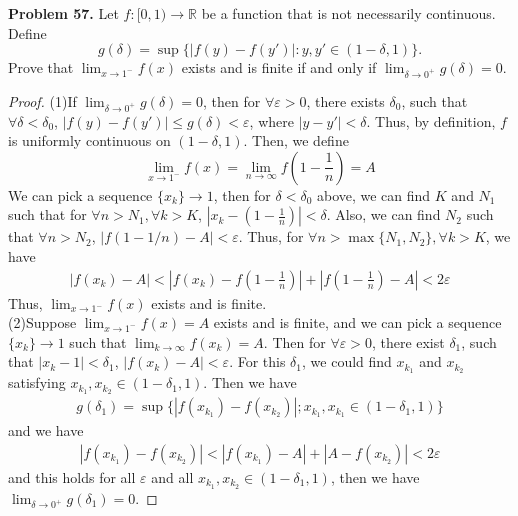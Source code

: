\documentclass[12pt,leqno]{amsart}
\begin{document}
\noindent
{\bf Problem 57.}
Let $f:[0,1)\to\mathbb{R}$ be a function that is not necessarily continuous. Define
$$
g(\delta)=\sup\{|f(y)-f(y')|:y,y'\in (1-\delta,1)\}.
$$
Prove that $\displaystyle\lim_{x\to 1^-} f(x)$ exists and is finite if and only if $\displaystyle\lim_{\delta\to 0^+}g(\delta)=0$.
\begin{proof}
(1)If $\lim_{\delta\to 0^+}g(\delta)=0$, then for $\forall \varepsilon>0$, there exists $\delta_0$, such that $\forall \delta<\delta_0$, $|f(y)-f(y')|\leq g(\delta)<\varepsilon$, where $|y-y'|<\delta$. Thus, by definition, $f$ is uniformly continuous on $(1-\delta,1)$. Then, we define $$\lim_{x\to 1^-}f(x)=\lim_{n\to\infty}f\left(1-\frac{1}{n}\right)=A$$
We can pick a sequence $\{x_k\}\rightarrow 1$, then for $\delta<\delta_0$ above, we can find $K$ and $N_1$ such that for $\forall n>N_1, \forall k > K$, $|x_k-(1-\frac{1}{n})|<\delta$. Also, we can find $N_2$ such that $\forall n>N_2$, $|f(1-1/n)-A|<\varepsilon$. Thus, for $\forall n>\max\{N_1,N_2\}, \forall k > K$, we have
\begin{align*}
    |f(x_k)-A|<\left|f(x_k)-f\left(1-\frac{1}{n}\right)\right|+\left|f\left(1-\frac{1}{n}\right)-A\right|<2\varepsilon
\end{align*}
Thus, $\lim_{x\to 1^-}f(x)$ exists and is finite. \\
\hspace*{3em}(2)Suppose $\lim_{x\to 1^-}f(x)=A$ exists and is finite, and we can pick a sequence $\{x_k\}\rightarrow 1$ such that $\lim_{k\to\infty}f(x_k)=A$. Then for $\forall \varepsilon >0$, there exist $\delta_1$, such that $|x_k-1|<\delta_1$, $|f(x_k)-A|<\varepsilon$. For this $\delta_1$, we could find $x_{k_1}$ and $x_{k_2}$ satisfying $x_{k_1}, x_{k_2}\in(1-\delta_1,1)$. Then we have 
\begin{align*}
    g(\delta_1) = \sup \{|f(x_{k_1})-f(x_{k_2})|;x_{k_1},x_{k_1}\in (1-\delta_1,1)\} 
\end{align*}
and we have 
\begin{align*}
    |f(x_{k_1})-f(x_{k_2})| < |f(x_{k_1})-A|+|A-f(x_{k_2})| < 2\varepsilon
\end{align*}
and this holds for all $\varepsilon$ and all $x_{k_1}, x_{k_2}\in (1-\delta_1,1)$, then we have $\lim_{\delta\to 0^+}g(\delta_1)=0$.
\end{proof}

\medskip
\end{document}
